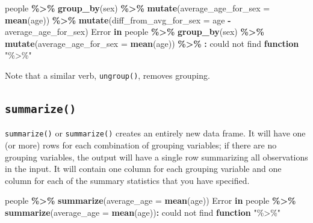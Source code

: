 \documentclass[
]{book}
\newenvironment{Shaded}{\begin{snugshade}}{\end{snugshade}}
\newcommand{\AttributeTok}[1]{\textcolor[rgb]{0.13,0.29,0.53}{#1}}
\newcommand{\ControlFlowTok}[1]{\textcolor[rgb]{0.13,0.29,0.53}{\textbf{#1}}}
\newcommand{\ErrorTok}[1]{\textcolor[rgb]{0.64,0.00,0.00}{\textbf{#1}}}
\newcommand{\FunctionTok}[1]{\textcolor[rgb]{0.13,0.29,0.53}{\textbf{#1}}}
\newcommand{\NormalTok}[1]{#1}
\newcommand{\SpecialCharTok}[1]{\textcolor[rgb]{0.81,0.36,0.00}{\textbf{#1}}}
\newcommand{\StringTok}[1]{\textcolor[rgb]{0.31,0.60,0.02}{#1}}
\begin{document}
\begin{Shaded}
\begin{Highlighting}[]
\NormalTok{people }\SpecialCharTok{\%\textgreater{}\%} 
  \FunctionTok{group\_by}\NormalTok{(sex) }\SpecialCharTok{\%\textgreater{}\%}
  \FunctionTok{mutate}\NormalTok{(}\AttributeTok{average\_age\_for\_sex =} \FunctionTok{mean}\NormalTok{(age)) }\SpecialCharTok{\%\textgreater{}\%}
  \FunctionTok{mutate}\NormalTok{(}\AttributeTok{diff\_from\_avg\_for\_sex =}\NormalTok{ age }\SpecialCharTok{{-}}\NormalTok{ average\_age\_for\_sex)}
\NormalTok{Error }\ControlFlowTok{in}\NormalTok{ people }\SpecialCharTok{\%\textgreater{}\%} \FunctionTok{group\_by}\NormalTok{(sex) }\SpecialCharTok{\%\textgreater{}\%} \FunctionTok{mutate}\NormalTok{(}\AttributeTok{average\_age\_for\_sex =} \FunctionTok{mean}\NormalTok{(age)) }\SpecialCharTok{\%\textgreater{}\%} \ErrorTok{:}\NormalTok{ could not find }\ControlFlowTok{function} \StringTok{"\%\textgreater{}\%"}
\end{Highlighting}
\end{Shaded}

Note that a similar verb, \texttt{ungroup()}, removes grouping.

\subsection*{\texorpdfstring{\texttt{summarize()}}{summarize()}}\label{summarize}

\texttt{summarize()} or \texttt{summarize()} creates an entirely new data frame. It will have one (or more) rows for each combination of grouping variables; if there are no grouping variables, the output will have a single row summarizing all observations in the input. It will contain one column for each grouping variable and one column for each of the summary statistics that you have specified.

\begin{Shaded}
\begin{Highlighting}[]
\NormalTok{people }\SpecialCharTok{\%\textgreater{}\%} 
  \FunctionTok{summarize}\NormalTok{(}\AttributeTok{average\_age =} \FunctionTok{mean}\NormalTok{(age))}
\NormalTok{Error }\ControlFlowTok{in}\NormalTok{ people }\SpecialCharTok{\%\textgreater{}\%} \FunctionTok{summarize}\NormalTok{(}\AttributeTok{average\_age =} \FunctionTok{mean}\NormalTok{(age))}\SpecialCharTok{:}\NormalTok{ could not find }\ControlFlowTok{function} \StringTok{"\%\textgreater{}\%"}
\end{Highlighting}
\end{Shaded}
\end{document}
